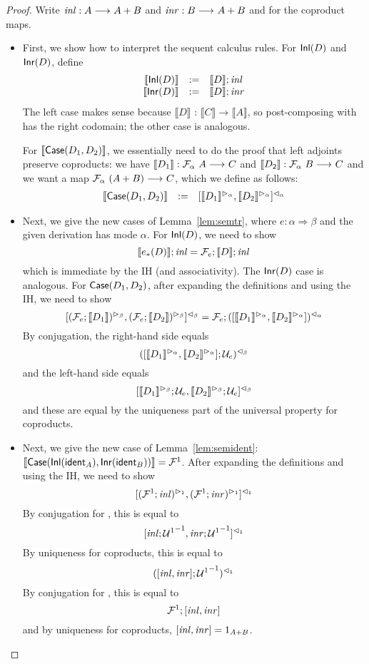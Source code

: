 \documentclass{drl-common/llncs}
\renewcommand{\sem}[1]{\ensuremath{ \llbracket #1 \rrbracket}}
\newcommand{\inv}[1]{\ensuremath{{#1}^{-1}}}
\newcommand{\arrow}[3]{\ensuremath{#2 \longrightarrow_{#1} #3}}
\newcommand{\tc}[2]{\ensuremath{#1 \Rightarrow #2}}
\newcommand\coprd[2]{\ensuremath{#1 + #2}}
\newcommand\tr[2]{\ensuremath{{{#1}_{*}(#2)}}}
\newcommand\ident[1]{\ensuremath{\dsd{ident}_{#1}}}
\newcommand\Inl[1]{\ensuremath{\dsd{Inl}(#1)}}
\newcommand\Inr[1]{\ensuremath{\dsd{Inr}(#1)}}
\newcommand\Case[2]{\ensuremath{\dsd{Case}(#1,#2)}}
\begin{document}
\begin{proof}  Write $\seminl : \arrow{}{A}{\coprd{A}{B}}$
and $\seminr : \arrow{}{B}{\coprd{A}{B}}$
and  for the coproduct maps.  

\begin{itemize}

\item First, we show how to interpret the sequent calculus rules.
 For \Inl{D} and \Inr{D}, define
\[
\begin{array}{rcl}
\sem{\Inl{D}} & := & \sem{D};\seminl\\
\sem{\Inr{D}} & := & \sem{D};\seminr\\
\end{array}
\]
The left case makes sense because \sem{D} : \arrow{}{\sem C}{\sem A}, so
post-composing with \seminl\/ has the right codomain; the other case is
analogous.  

For \sem{\Case{D_1}{D_2}}, we essentially need to do the proof that left adjoints
preserve coproducts: we have
$\sem{D_1} : \arrow{}{\semF{\alpha}{A}}{C}$
and 
$\sem{D_2} : \arrow{}{\semF{\alpha}{B}}{C}$
and we want a map
$\arrow{}{\semF{\alpha}{(\coprd{A}{B})}}{C}$, which we define as
follows:
\[
\begin{array}{rcl}
\sem{\Case{D_1}{D_2}} & := & \semrtol{\semcase{\semltor{\sem{D_1}}{\alpha}}{\semltor{\sem{D_2}}{\alpha}}}{\alpha}
\end{array}
\]

\item Next, we give the new cases of Lemma~\ref{lem:semtr}, where $e :
  \tc{\alpha}{\beta}$ and the given derivation has mode $\alpha$.
For \Inl{D}, we need to show
\[
\sem{\tr e D};\seminl = \semFo{e};\sem{D};\seminl
\]
which is immediate by the IH (and associativity).  The \Inr{D} case is
analogous.  For \Case{D_1}{D_2}, after expanding the definitions and
using the IH, we need to show
\[
\semrtol{\semcase{\semltor{(\semFo{e};\sem{D_1})}{\beta}}{\semltor{(\semFo{e};\sem{D_2})}{\beta}}}{\beta} = \semFo{e};\semrtol{(\semcase{\semltor{\sem{D_1}}{\alpha}}{\semltor{\sem{D_2}}{\alpha}})}{\alpha}
\]
By conjugation, the right-hand side equals
\[
\semrtol{(\semcase{\semltor{\sem{D_1}}{\alpha}}{\semltor{\sem{D_2}}{\alpha}};\semUo{e})}{\beta}
\]
and the left-hand side equals 
\[
\semrtol{\semcase{\semltor{\sem{D_1}}{\beta};\semUo{e}}{\semltor{\sem{D_2}}{\beta};\semUo{e}}}{\beta}
\]
and these are equal by the uniqueness part of the universal property for coproducts.

\item 
Next, we give the new case of Lemma~\ref{lem:semident}:
$\sem{\Case {\Inl {\ident{A}}} {\Inr {\ident{B}}}} = \semFone$.
After expanding the definitions and using the IH, we need to show
\[
[({\mathcal{F}^1};\mathit{inl})^{\vartriangleright_{1}},({\mathcal{F}^1};\mathit{inr})^{\vartriangleright_{1}}]^{\vartriangleleft_{1}}
\]
By conjugation for \semFone, this is equal to
\[
\semrtol{\semcase{\seminl;\inv{\semUone}}{\seminr;\inv{\semUone}}}{1}
\]
By uniqueness for coproducts, this is equal to
\[
\semrtol{(\semcase{\seminl}{\seminr};{\inv{\semUone}})}{1}
\]
By conjugation for \semUone, this is equal to 
\[
{\mathcal{F}^1};{[\mathit{inl},\mathit{inr}]}
\]
and by uniqueness for coproducts, $\semcase{\seminl}{\seminr} = 1_{\coprd{A}{B}}$.  


\end{itemize}
\end{proof}
\end{document}
